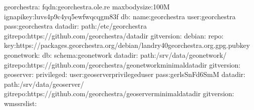 \documentclass[letterpaper,10pt,french]{sphinxmanual}
\begin{document}
\begin{sphinxVerbatim}[commandchars=\\\{\}]
georchestra:
fqdn:georchestra.ole.re
max\PYGZus{}body\PYGZus{}size:100M
ign\PYGZus{}api\PYGZus{}key:luvs4p9c4yq5ewfwqcqgm83f
db:
name:georchestra
user:georchestra
pass:georchestra
datadir:
path:/etc/georchestra
gitrepo:https://github.com/georchestra/datadir
gitversion:
debian:
repo:
key:https://packages.georchestra.org/debian/landry\PYGZpc{}40georchestra.org.gpg.pubkey
geonetwork:
db:
schema:geonetwork
datadir:
path:/srv/data/geonetwork/
gitrepo:https://github.com/georchestra/geonetwork\PYGZus{}minimal\PYGZus{}datadir
gitversion:
geoserver:
privileged:
user:geoserver\PYGZus{}privileged\PYGZus{}user
pass:gerlsSnFd6SmM
datadir:
path:/srv/data/geoserver/
gitrepo:https://github.com/georchestra/geoserver\PYGZus{}minimal\PYGZus{}datadir
gitversion:
wms\PYGZus{}srslist:
\PYGZhy{}
\PYGZhy{}
\PYGZhy{}
\PYGZhy{}
\PYGZhy{}
\PYGZhy{}
\PYGZhy{}
\PYGZhy{}
\PYGZhy{}
\PYGZhy{}
\PYGZhy{}

\end{sphinxVerbatim}
\end{document}
